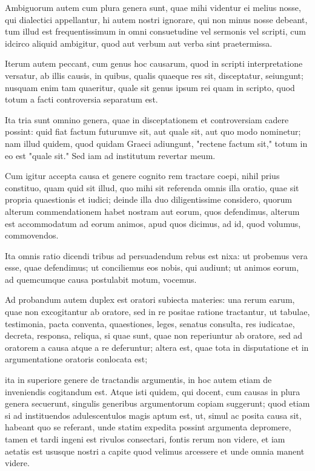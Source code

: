  Ambiguorum autem cum plura genera sunt, quae mihi videntur ei melius nosse, qui dialectici appellantur, hi autem nostri ignorare, qui non minus nosse debeant, tum illud est frequentissimum in omni consuetudine vel sermonis vel scripti, cum idcirco aliquid ambigitur, quod aut verbum aut verba sint praetermissa.

 Iterum autem peccant, cum genus hoc causarum, quod in scripti interpretatione versatur, ab illis causis, in quibus, qualis quaeque res sit, disceptatur, seiungunt; nusquam enim tam quaeritur, quale sit genus ipsum rei quam in scripto, quod totum a facti controversia separatum est.

 Ita tria sunt omnino genera, quae in disceptationem et controversiam cadere possint: quid fiat factum futurumve sit, aut quale sit, aut quo modo nominetur; nam illud quidem, quod quidam Graeci adiungunt, "rectene factum sit," totum in eo est "quale sit." Sed iam ad institutum revertar meum.

 Cum igitur accepta causa et genere cognito rem tractare coepi, nihil prius constituo, quam quid sit illud, quo mihi sit referenda omnis illa oratio, quae sit propria quaestionis et iudici; deinde illa duo diligentissime considero, quorum alterum commendationem habet nostram aut eorum, quos defendimus, alterum est accommodatum ad eorum animos, apud quos dicimus, ad id, quod volumus, commovendos.

 Ita omnis ratio dicendi tribus ad persuadendum rebus est nixa: ut probemus vera esse, quae defendimus; ut conciliemus eos nobis, qui audiunt; ut animos eorum, ad quemcumque causa postulabit motum, vocemus.

 Ad probandum autem duplex est oratori subiecta materies: una rerum earum, quae non excogitantur ab oratore, sed in re positae ratione tractantur, ut tabulae, testimonia, pacta conventa, quaestiones, leges, senatus consulta, res iudicatae, decreta, responsa, reliqua, si quae sunt, quae non reperiuntur ab oratore, sed ad oratorem a causa atque a re deferuntur; altera est, quae tota in disputatione et in argumentatione oratoris conlocata est;

 ita in superiore genere de tractandis argumentis, in hoc autem etiam de inveniendis cogitandum est. Atque isti quidem, qui docent, cum causas in plura genera secuerunt, singulis generibus argumentorum copiam suggerunt; quod etiam si ad instituendos adulescentulos magis aptum est, ut, simul ac posita causa sit, habeant quo se referant, unde statim expedita possint argumenta depromere, tamen et tardi ingeni est rivulos consectari, fontis rerum non videre, et iam aetatis est ususque nostri a capite quod velimus arcessere et unde omnia manent videre.

